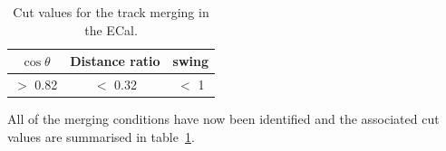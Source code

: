 \begin{table}[b!]
  \begin{tabular}{ c c c }
    $\cos\theta$ & Distance ratio & swing \\ \hline \hline
    $>$ 0.82 & $<$ 0.32 & $<$ 1 \\
  \end{tabular}
  \caption{Cut values for the track merging in the ECal.}
  \label{table:TrackMergingParameters}
\end{table}
\newline
\newline
All of the merging conditions have now been identified and the associated cut values are summarised in table~\ref{table:TrackMergingParameters}.




